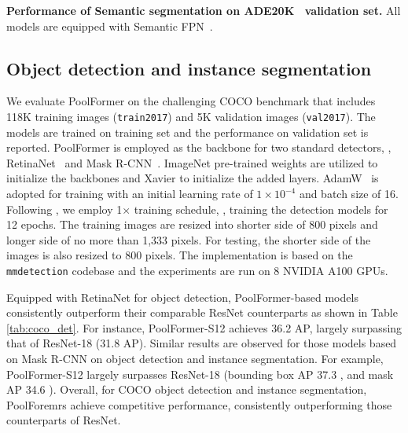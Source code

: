 \begin{table}[t]
\small
\centering
\setlength{\tabcolsep}{3.5pt}

\vspace{-3mm}
\caption{\textbf{Performance of Semantic segmentation on ADE20K~\cite{ade20k} validation set.} All models are equipped with Semantic FPN~\cite{fpn}.}
\label{tab:ade20k}
\normalsize
\vspace{-5mm}
\end{table}


\subsection{Object detection and instance segmentation}
\vspace{-1pt}
 We evaluate PoolFormer on the challenging COCO benchmark \cite{coco} that includes 118K training images (\texttt{train2017}) and 5K validation images (\texttt{val2017}). The models are trained on training set and the performance on validation set is reported. PoolFormer is employed as the backbone for two standard detectors, \ie, RetinaNet~\cite{retinanet} and Mask R-CNN~\cite{mask_rcnn}. ImageNet pre-trained weights are utilized to initialize the backbones and Xavier \cite{glorot2010understanding} to initialize the added layers. AdamW~\cite{adam, adamw}  is adopted for training with an initial learning rate of $1\times10^{-4}$ and batch size of 16. Following \cite{retinanet, mask_rcnn}, we employ 1$\times$ training schedule, \ie, training the detection models for 12 epochs. The training images are resized into shorter side of 800 pixels and longer side of no more than 1,333 pixels. For testing, the shorter side of the images is also resized to 800 pixels. The implementation is based on the \texttt{mmdetection} \cite{mmdetection} codebase and the experiments are run on 8 NVIDIA A100 GPUs. 

Equipped with RetinaNet for object detection, PoolFormer-based models consistently outperform their comparable ResNet counterparts as shown in Table \ref{tab:coco_det}. For instance, PoolFormer-S12 achieves 36.2 AP, largely surpassing that of ResNet-18 (31.8 AP). 
Similar results are observed for those models based on Mask R-CNN on object detection and instance segmentation. For example, PoolFormer-S12 largely surpasses ResNet-18 (bounding box AP 37.3 , and mask AP 34.6 ). 
Overall, for COCO object detection and instance segmentation, PoolForemrs achieve competitive performance, consistently outperforming those counterparts of ResNet. 


